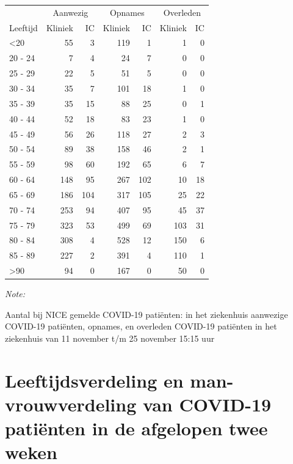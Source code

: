 \documentclass[
  english,
  man,floatsintext]{apa6}
\begin{document}
\begin{table}
\centering\begingroup\fontsize{10}{12}\selectfont

\begin{threeparttable}
\begin{tabular}{lrrrrrr}
\toprule
\multicolumn{1}{c}{ } & \multicolumn{2}{c}{Aanwezig} & \multicolumn{2}{c}{Opnames} & \multicolumn{2}{c}{Overleden} \\
\cmidrule(l{3pt}r{3pt}){2-3} \cmidrule(l{3pt}r{3pt}){4-5} \cmidrule(l{3pt}r{3pt}){6-7}
Leeftijd & Kliniek & IC & Kliniek & IC & Kliniek & IC\\
\midrule
<20 & 55 & 3 & 119 & 1 & 1 & 0\\
20 - 24 & 7 & 4 & 24 & 7 & 0 & 0\\
25 - 29 & 22 & 5 & 51 & 5 & 0 & 0\\
30 - 34 & 35 & 7 & 101 & 18 & 1 & 0\\
35 - 39 & 35 & 15 & 88 & 25 & 0 & 1\\
40 - 44 & 52 & 18 & 83 & 23 & 1 & 0\\
45 - 49 & 56 & 26 & 118 & 27 & 2 & 3\\
50 - 54 & 89 & 38 & 158 & 46 & 2 & 1\\
55 - 59 & 98 & 60 & 192 & 65 & 6 & 7\\
60 - 64 & 148 & 95 & 267 & 102 & 10 & 18\\
65 - 69 & 186 & 104 & 317 & 105 & 25 & 22\\
70 - 74 & 253 & 94 & 407 & 95 & 45 & 37\\
75 - 79 & 323 & 53 & 499 & 69 & 103 & 31\\
80 - 84 & 308 & 4 & 528 & 12 & 150 & 6\\
85 - 89 & 227 & 2 & 391 & 4 & 110 & 1\\
>90 & 94 & 0 & 167 & 0 & 50 & 0\\
\bottomrule
\end{tabular}
\begin{tablenotes}
\item \textit{Note: } 
\item Aantal bij NICE gemelde COVID-19 patiënten: in het ziekenhuis aanwezige COVID-19 patiënten, opnames, en overleden COVID-19 patiënten in het ziekenhuis van 11 november t/m 25 november 15:15 uur
\end{tablenotes}
\end{threeparttable}
\endgroup{}
\end{table}

\newpage

\hypertarget{leeftijdsverdeling-en-man-vrouwverdeling-van-covid-19-patiuxebnten-in-de-afgelopen-twee-weken}{%
\section{Leeftijdsverdeling en man-vrouwverdeling van COVID-19 patiënten in de afgelopen twee weken}\label{leeftijdsverdeling-en-man-vrouwverdeling-van-covid-19-patiuxebnten-in-de-afgelopen-twee-weken}}
\end{document}
